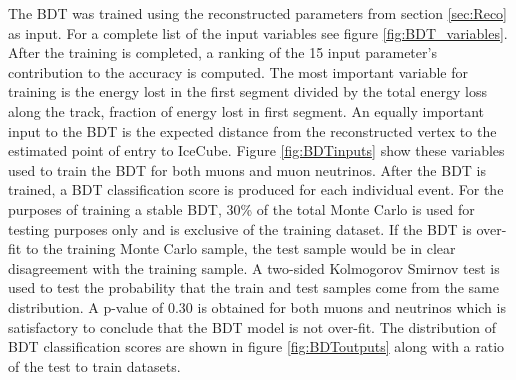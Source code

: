 \documentclass{PoS}
\begin{document}
The BDT was trained using the reconstructed parameters from section \ref{sec:Reco} as input. For a complete list of the input variables see figure \ref{fig:BDT_variables}. After the training is completed, a ranking of the 15 input parameter's contribution to the accuracy is computed. The most important variable for training is the energy lost in the first segment divided by the total energy loss along the track, fraction of energy lost in first segment. An equally important input to the BDT is the expected distance from the reconstructed vertex to the estimated point of entry to IceCube. Figure \ref{fig:BDTinputs} show these variables used to train the BDT for both muons and muon neutrinos. After the BDT is trained, a BDT classification score is produced for each individual event. For the purposes of training a stable BDT, 30\% of the total Monte Carlo is used for testing purposes only and is exclusive of the training dataset. If the BDT is over-fit to the training Monte Carlo sample, the test sample would be in clear disagreement with the training sample. A two-sided Kolmogorov Smirnov test is used to test the probability that the train and test samples come from the same distribution. A p-value of 0.30 is obtained for both muons and neutrinos which is satisfactory to conclude that the BDT model is not over-fit. The distribution of BDT classification scores are shown in figure \ref{fig:BDToutputs} along with a ratio of the test to train datasets.
\end{document}
